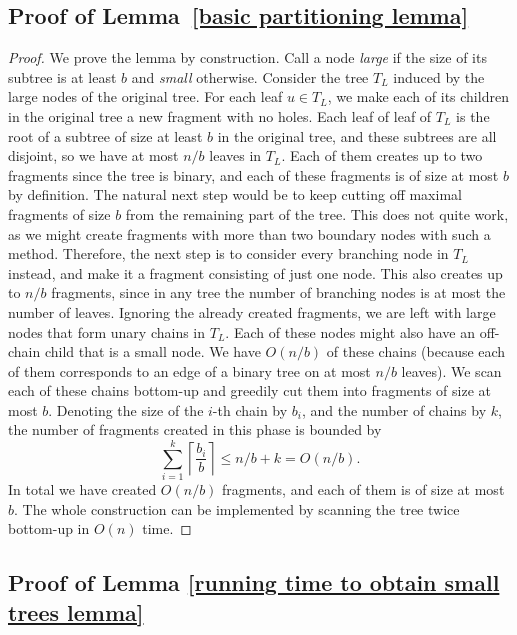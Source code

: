 \documentclass[a4paper,UKenglish]{lipics-v2016}
\theoremstyle{plain}
\begin{document}
\subsection{Proof of Lemma~\ref{basic partitioning lemma}}\label{appendix proof of basic partitioning lemma}

\basicpartitioninglemma*

\begin{proof}
We prove the lemma by construction. Call a node \textit{large} if the size of its subtree is at least $b$
and \textit{small} otherwise. Consider the tree $T_L$ induced by the large nodes of the original tree. 
For each leaf $u\in T_{L}$, we make each of its children in the original tree a new fragment with no holes.
Each leaf of leaf of $T_{L}$ is the root of a subtree of size at least $b$ in the original tree, and these subtrees
are all disjoint, so we have at most $n/b$ leaves in $T_{L}$. Each of them creates up to two fragments
since the tree is binary, and each of these fragments is of size at most $b$ by definition.
The natural next step would be to keep cutting off maximal fragments of size $b$ from the remaining
part of the tree. This does not quite work, as we might create fragments with more than two boundary
nodes with such a method.
Therefore, the next step is to consider every branching node in $T_{L}$ instead, and make it a fragment
consisting of just one node. This also creates up to $n/b$ fragments, since in any tree the number of
branching nodes is at most the number of leaves.
Ignoring the already created fragments, we are left with large nodes that form unary chains in $T_{L}$.
Each of these nodes might also have an off-chain child that is a small node. We have $O(n/b)$ of these chains
(because each of them corresponds to an edge of a binary tree on at most $n/b$ leaves).
We scan each of these chains bottom-up and greedily cut them into fragments of size at most $b$.
Denoting the size of the $i$-th chain by $b_{i}$, and the number of chains by $k$, the number of fragments created in this phase is
bounded by $$\sum_{i=1}^{k} \left\lceil \frac{b_i}{b} \right\rceil \leq n/b+k=O(n/b).$$
In total we have created $O(n/b)$ fragments, and each of them is of size at most $b$.
The whole construction can be implemented by scanning the tree twice bottom-up in $O(n)$ time.
\end{proof}


\subsection{Proof of Lemma \ref{running time to obtain small trees lemma}}\label{appendix proof of running time to obtain small trees lemma}
\end{document}
